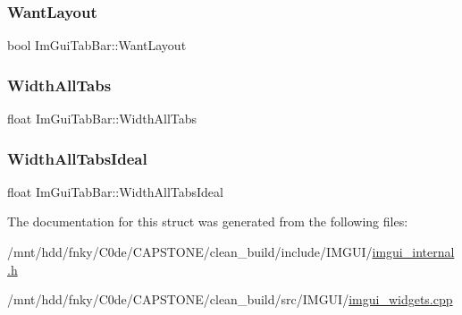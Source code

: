 \subsubsection{\texorpdfstring{Want\+Layout}{WantLayout}}
{\footnotesize\ttfamily bool Im\+Gui\+Tab\+Bar\+::\+Want\+Layout}

\mbox{\label{structImGuiTabBar_a399daf37a3468ef8311a2093a575e263}} 
\subsubsection{\texorpdfstring{Width\+All\+Tabs}{WidthAllTabs}}
{\footnotesize\ttfamily float Im\+Gui\+Tab\+Bar\+::\+Width\+All\+Tabs}

\mbox{\label{structImGuiTabBar_ad096f5f78c82eed61281b41c6d065f0a}} 
\subsubsection{\texorpdfstring{Width\+All\+Tabs\+Ideal}{WidthAllTabsIdeal}}
{\footnotesize\ttfamily float Im\+Gui\+Tab\+Bar\+::\+Width\+All\+Tabs\+Ideal}



The documentation for this struct was generated from the following files\+:\begin{DoxyCompactItemize}
\item 
/mnt/hdd/fnky/\+C0de/\+C\+A\+P\+S\+T\+O\+N\+E/clean\+\_\+build/include/\+I\+M\+G\+U\+I/\hyperlink{imgui__internal_8h}{imgui\+\_\+internal.\+h}\item 
/mnt/hdd/fnky/\+C0de/\+C\+A\+P\+S\+T\+O\+N\+E/clean\+\_\+build/src/\+I\+M\+G\+U\+I/\hyperlink{imgui__widgets_8cpp}{imgui\+\_\+widgets.\+cpp}\end{DoxyCompactItemize}
